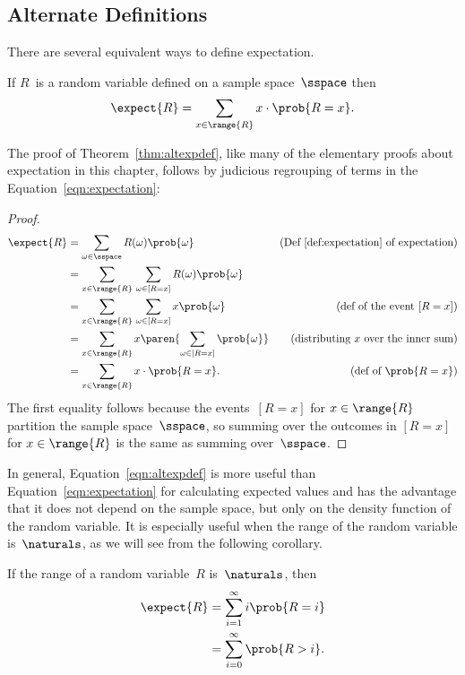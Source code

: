 \subsection{Alternate Definitions}

There are several equivalent ways to define expectation.

\begin{theorem}\label{thm:altexpdef}
If $R$~is a random variable defined on a sample space~$\sspace$ then
\begin{equation}\label{eqn:altexpdef}
    \expect{R} = \sum_{x \in \range{R}} x \cdot \prob{R = x}.
\end{equation}
\end{theorem}
The proof of Theorem~\ref{thm:altexpdef}, like many of the elementary proofs
about expectation in this chapter, follows by judicious regrouping of terms
in the Equation~\ref{eqn:expectation}:
\begin{proof}
\begin{align*}
\expect{R}
    &= \sum_{\omega \in \sspace} R(\omega) \prob{\omega}
            &\text{(Def~\ref{def:expectation} of expectation)} \\
    &= \sum_{x \in \range{R}} \, \sum_{\omega \in [R=x]} R(\omega) \prob{\omega}
                \\
    &= \sum_{x \in \range{R}} \, \sum_{\omega \in [R=x]} x \prob{\omega}
            &\text{(def of the event $[R=x]$)}\\
    &= \sum_{x \in \range{R}} x \paren{\sum_{\omega \in [R=x]} \prob{\omega}}
            & \text{(distributing $x$ over the inner sum)} \\
    &= \sum_{x \in \range{R}} x \cdot \prob{R = x}.
            & \text{(def of $\prob{R=x}$)}
\end{align*}
The first equality follows because the events~$[R=x]$ for $x \in
\range{R}$ partition the sample space~$\sspace$, so summing over the
outcomes in $[R=x]$ for $x \in \range{R}$ is the same as summing
over~$\sspace$.
\end{proof}

In general, Equation~\ref{eqn:altexpdef} is more useful than
Equation~\ref{eqn:expectation} for calculating expected values and has
the advantage that it does not depend on the sample space, but only on
the density function of the random variable.  It is especially useful
when the range of the random variable is~$\naturals$, as we will see
from the following corollary.

\begin{corollary}\label{cor:17A4}
If the range of a random variable~$R$ is~$\naturals$, then
\begin{align*}
\expect{R}
    &= \sum_{i = 1}^\infty i \prob{R = i} \notag\\
    &= \sum_{i = 0}^\infty \prob{R > i}. \label{eqn:17A6}
\end{align*}
\end{corollary}

